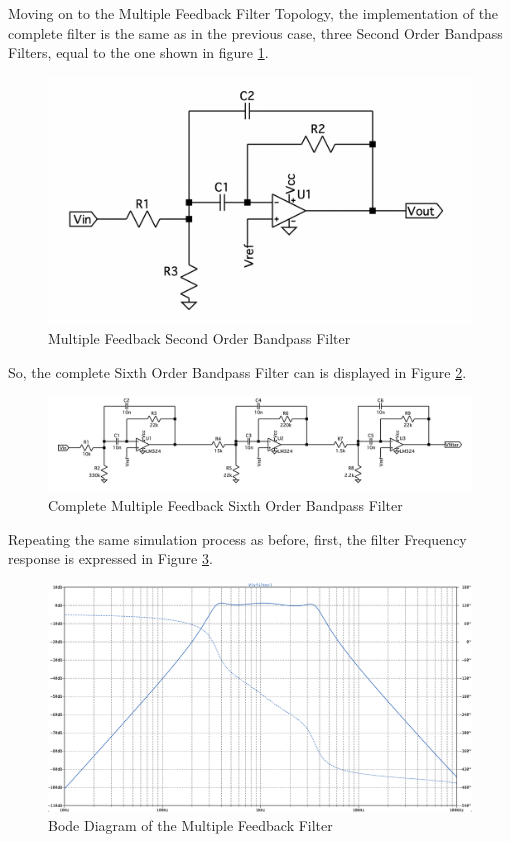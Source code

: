 Moving on to the Multiple Feedback Filter Topology, the implementation of the complete filter is the same as in the previous case, three Second Order Bandpass Filters, equal to the one shown in figure \ref{fig:SingleMFB}.

\begin{figure}[H]
    \centering
    \includegraphics*[scale = 0.3]{Images/SingleMFB.png}
    \caption{Multiple Feedback Second Order Bandpass Filter}
    \label{fig:SingleMFB}
\end{figure}

So, the complete Sixth Order Bandpass Filter can is displayed in Figure \ref{fig:MFBFilter}.

\begin{figure}[H]
    \centering
    \includegraphics*[scale = 0.4]{Images/MFBFilter.png}
    \caption{Complete Multiple Feedback Sixth Order Bandpass Filter}
    \label{fig:MFBFilter}
\end{figure}

Repeating the same simulation process as before, first, the filter Frequency response is expressed in Figure \ref{fig:SimMFBFilter}.

\begin{figure}[H]
    \centering
    \includegraphics*[scale = 0.25]{Images/SimMFBFilter.png}
    \caption{Bode Diagram of the Multiple Feedback Filter}
    \label{fig:SimMFBFilter}
\end{figure}


